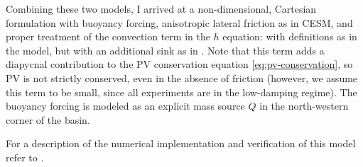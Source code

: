 Combining these two models, I arrived at a non-dimensional, Cartesian formulation with buoyancy forcing, anisotropic lateral friction as in \ac{CESM}, and proper treatment of the convection term in the \(h\) equation:
%
%
with definitions as in the \citeauthor{killworth} model, but with an additional sink as in \cite{kawase}. Note that this term adds a diapycnal contribution to the \ac{PV} conservation equation \eqref{eq:pv-conservation}, so \ac{PV} is not strictly conserved, even in the absence of friction (however, we assume this term to be small, since all experiments are in the low-damping regime). The buoyancy forcing is modeled as an explicit mass source \(Q\) in the north-western corner of the basin.

For a description of the numerical implementation and verification of this model refer to .

